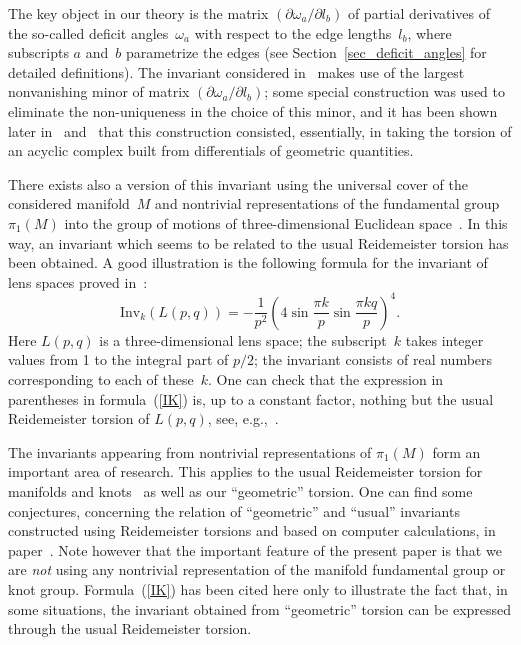 \documentclass[pdftex]{sigma}
\begin{document}
The key object in our theory is the matrix $(\partial\omega_a/\partial l_b)$ of partial derivatives of the so-called def\/icit angles~$\omega_a$ with respect to the edge lengths~$l_b$, where subscripts $a$ and~$b$ parametrize the edges (see Section~\ref{sec_deficit_angles} for detailed def\/initions). The invariant considered in~\cite{JNMP1} makes use of the largest nonvanishing minor of matrix $(\partial\omega_a/\partial l_b)$; some special construction was used to eliminate the non-uniqueness in the choice of this minor, and it has been shown later in~\cite[Section~2]{TMP24} and~\cite[Section~2]{TMP15} that this construction consisted, essentially, in taking the torsion of an acyclic complex built from dif\/ferentials of geometric quantities.

There exists also a version of this invariant using the universal cover of the considered manifold~$M$ and nontrivial representations of the fundamental group $\pi_1(M)$ into the group of motions of three-dimensional Euclidean space~\cite{KM}. In this way, an invariant which seems to be related to the usual Reidemeister torsion has been obtained. A good illustration is the following formula for the invariant of lens spaces proved in~\cite{M-thesis}:
\begin{equation}\label{IK}
\mathrm{Inv}_k\left(L(p, q)\right) = - \frac{1}{p^2} \left(4 \sin \frac{\pi k}{p} \sin \frac{\pi k q}{p}\right)^4.
\end{equation}
Here $L(p, q)$ is a three-dimensional lens space; the subscript~$k$ takes integer values from 1 to the integral part of $p/2$; the invariant consists of real numbers corresponding to each of these~$k$. One can check that the expression in parentheses in formula~(\ref{IK}) is, up to a constant factor, nothing but the usual Reidemeister torsion of $L(p,q)$, see, e.g.,~\cite[Theorem~10.6]{Turaev:2001}.

The invariants appearing from nontrivial representations of $\pi_1(M)$ form an important area of research. This applies to the usual Reidemeister torsion for manifolds and knots~\cite{JDFourier} as well as our ``geometric'' torsion. One can f\/ind some conjectures, concerning the relation of ``geometric'' and ``usual'' invariants constructed using Reidemeister torsions and based on computer calculations, in paper~\cite{M}. Note however that the important feature of the present paper is that we are \emph{not} using any nontrivial representation of the manifold fundamental group or knot group. Formula~(\ref{IK}) has been cited here only to illustrate the fact that, in some situations, the invariant obtained from ``geometric'' torsion can be expressed through the usual Reidemeister torsion.
\end{document}
